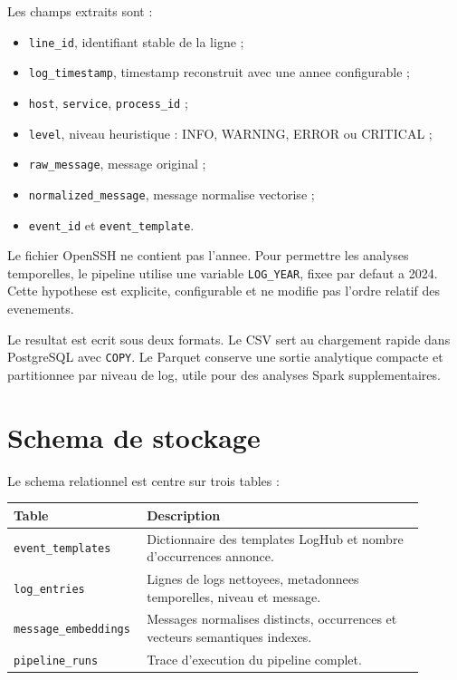 \documentclass[12pt,a4paper]{article}
\begin{document}
Les champs extraits sont :

\begin{itemize}
  \item \texttt{line\_id}, identifiant stable de la ligne ;
  \item \texttt{log\_timestamp}, timestamp reconstruit avec une annee configurable ;
  \item \texttt{host}, \texttt{service}, \texttt{process\_id} ;
  \item \texttt{level}, niveau heuristique : INFO, WARNING, ERROR ou CRITICAL ;
  \item \texttt{raw\_message}, message original ;
  \item \texttt{normalized\_message}, message normalise vectorise ;
  \item \texttt{event\_id} et \texttt{event\_template}.
\end{itemize}

Le fichier OpenSSH ne contient pas l'annee. Pour permettre les analyses temporelles, le pipeline
utilise une variable \texttt{LOG\_YEAR}, fixee par defaut a 2024. Cette hypothese est explicite,
configurable et ne modifie pas l'ordre relatif des evenements.

Le resultat est ecrit sous deux formats. Le CSV sert au chargement rapide dans PostgreSQL avec
\texttt{COPY}. Le Parquet conserve une sortie analytique compacte et partitionnee par niveau de log,
utile pour des analyses Spark supplementaires.

\section{Schema de stockage}

Le schema relationnel est centre sur trois tables :

\begin{longtable}{p{0.25\linewidth}p{0.65\linewidth}}
\toprule
Table & Description\\
\midrule
\texttt{event\_templates} & Dictionnaire des templates LogHub et nombre d'occurrences annonce.\\
\texttt{log\_entries} & Lignes de logs nettoyees, metadonnees temporelles, niveau et message.\\
\texttt{message\_embeddings} & Messages normalises distincts, occurrences et vecteurs semantiques indexes.\\
\texttt{pipeline\_runs} & Trace d'execution du pipeline complet.\\
\bottomrule
\end{longtable}
\end{document}
